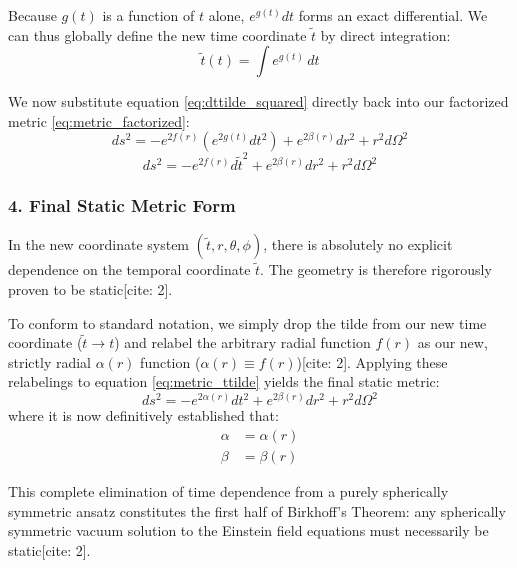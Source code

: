 \documentclass[11pt, a4paper]{report}
\begin{document}
Because $g(t)$ is a function of $t$ alone, $e^{g(t)} dt$ forms an exact differential. We can thus globally define the new time coordinate $\tilde{t}$ by direct integration:
\begin{equation}
    \tilde{t}(t) = \int e^{g(t)} \, dt \label{eq:t_tilde_def}
\end{equation}

We now substitute equation \eqref{eq:dttilde_squared} directly back into our factorized metric \eqref{eq:metric_factorized}:
\begin{equation}
    ds^2 = -e^{2f(r)} \left( e^{2g(t)} dt^2 \right) + e^{2\beta(r)} dr^2 + r^2 d\Omega^2
\end{equation}
\begin{equation}
    ds^2 = -e^{2f(r)} d\tilde{t}^2 + e^{2\beta(r)} dr^2 + r^2 d\Omega^2 \label{eq:metric_ttilde}
\end{equation}

\subsubsection*{4. Final Static Metric Form}

In the new coordinate system $(\tilde{t}, r, \theta, \phi)$, there is absolutely no explicit dependence on the temporal coordinate $\tilde{t}$. The geometry is therefore rigorously proven to be static[cite: 2]. 

To conform to standard notation, we simply drop the tilde from our new time coordinate ($\tilde{t} \to t$) and relabel the arbitrary radial function $f(r)$ as our new, strictly radial $\alpha(r)$ function ($\alpha(r) \equiv f(r)$)[cite: 2]. Applying these relabelings to equation \eqref{eq:metric_ttilde} yields the final static metric:
\begin{equation}
    ds^2 = -e^{2\alpha(r)} dt^2 + e^{2\beta(r)} dr^2 + r^2 d\Omega^2 \label{eq:static_metric}
\end{equation}
where it is now definitively established that:
\begin{align}
    \alpha &= \alpha(r) \\
    \beta &= \beta(r)
\end{align}

This complete elimination of time dependence from a purely spherically symmetric ansatz constitutes the first half of Birkhoff's Theorem: any spherically symmetric vacuum solution to the Einstein field equations must necessarily be static[cite: 2].

\end{document}
